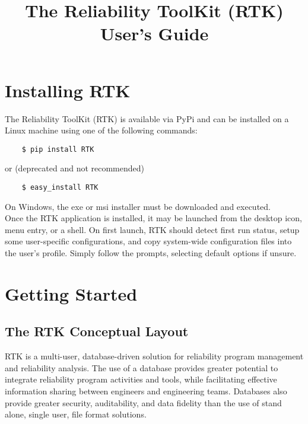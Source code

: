 \documentclass[twoside,12pt,letterpaper,openright]{book}
\begin{document}
\title{The Reliability ToolKit (RTK) User's Guide}

\chapter{Installing RTK}

\noindent The Reliability ToolKit (RTK) is available via PyPi and can be
installed on a Linux machine using one of the following commands:

\begin{lstlisting}
    $ pip install RTK
\end{lstlisting}

\noindent or (deprecated and not recommended)

\begin{lstlisting}
    $ easy_install RTK
\end{lstlisting}

\noindent On Windows, the exe or msi installer must be downloaded and executed.
\\

\noindent Once the RTK application is installed, it may be launched from the
desktop icon, menu entry, or a shell.  On first launch, RTK should detect first
run status, setup some user-specific configurations, and copy system-wide
configuration files into the user's profile.  Simply follow the prompts,
selecting default options if unsure.

\chapter{Getting Started}

\section{The RTK Conceptual Layout}

\noindent RTK is a multi-user, database-driven solution for reliability
program management and reliability analysis.  The use of a database provides
greater potential to integrate reliability program activities and tools, while
facilitating effective information sharing between engineers and engineering
teams.  Databases also provide greater security, auditability, and data
fidelity than the use of stand alone, single user, file format solutions.
\\
\end{document}

